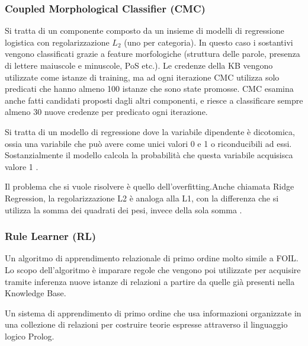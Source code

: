 \subsubsection{Coupled Morphological Classifier (CMC)}
Si tratta di un componente composto da un insieme di modelli di regressione logistica con regolarizzazione $L_{2}$ (uno per categoria). In questo caso i sostantivi vengono classificati grazie a feature morfologiche (struttura delle parole, presenza di lettere maiuscole e minuscole, PoS etc.). Le credenze della KB vengono utilizzate come istanze di training, ma ad ogni iterazione CMC utilizza solo predicati che hanno almeno 100 istanze che sono state promosse.
CMC esamina anche fatti candidati proposti dagli altri componenti, e riesce a classificare sempre almeno 30 nuove credenze per predicato ogni iterazione\cite{TowardAnArchitecture:online}.
\begin{info}
Si tratta di un modello di regressione dove la variabile dipendente è dicotomica, ossia una variabile che può avere come unici valori 0 e 1 o riconducibili ad essi. Sostanzialmente il modello calcola la probabilità che questa variabile acquisisca valore 1 \cite{Modellol35:online}.
\end{info}

\begin{info}[Regolarizzazione L2]
	Il problema che si vuole risolvere è quello dell'overfitting.\newline Anche chiamata Ridge Regression, la regolarizzazione L2 è analoga alla L1, con la differenza che si utilizza la somma dei quadrati dei pesi, invece della sola somma \cite{DeepLear11:online}.
\end{info}

\subsubsection{Rule Learner (RL)}
Un algoritmo di apprendimento relazionale di primo ordine molto simile a FOIL. Lo scopo dell'algoritmo è imparare regole che vengono poi utilizzate per acquisire tramite inferenza nuove istanze di relazioni a partire da quelle già presenti nella Knowledge Base.
\begin{info}[FOIL]
	Un sistema di apprendimento di primo ordine che usa informazioni organizzate in una collezione di relazioni per costruire teorie espresse attraverso il linguaggio logico Prolog\cite{Inductio61:online}.
\end{info}

